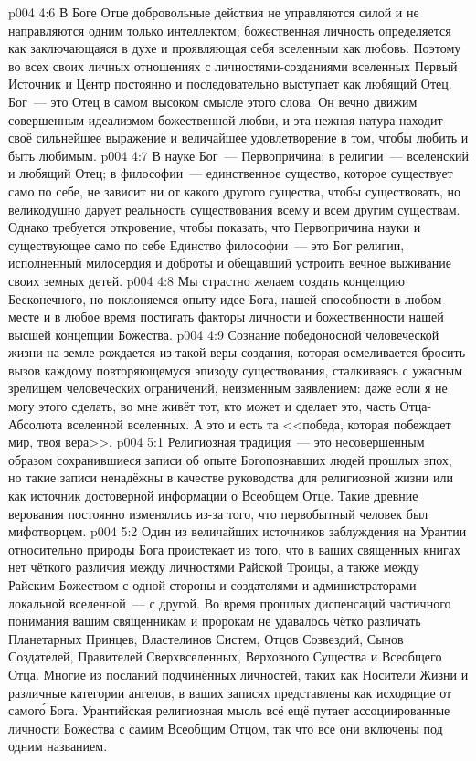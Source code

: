 \vs p004 4:6 В Боге Отце добровольные действия не управляются силой и не направляются одним только интеллектом; божественная личность определяется как заключающаяся в духе и проявляющая себя вселенным как любовь. Поэтому во всех своих личных отношениях с личностями\hyp{}созданиями вселенных Первый Источник и Центр постоянно и последовательно выступает как любящий Отец. Бог~--- это Отец в самом высоком смысле этого слова. Он вечно движим совершенным идеализмом божественной любви, и эта нежная натура находит своё сильнейшее выражение и величайшее удовлетворение в том, чтобы любить и быть любимым.
\vs p004 4:7 \pc В науке Бог~--- Первопричина; в религии~--- вселенский и любящий Отец; в философии~--- единственное существо, которое существует само по себе, не зависит ни от какого другого существа, чтобы существовать, но великодушно дарует реальность существования всему и всем другим существам. Однако требуется откровение, чтобы показать, что Первопричина науки и существующее само по себе Единство философии~--- это Бог религии, исполненный милосердия и доброты и обещавший устроить вечное выживание своих земных детей.
\vs p004 4:8 Мы страстно желаем создать концепцию Бесконечного, но поклоняемся опыту\hyp{}идее Бога, нашей способности в любом месте и в любое время постигать факторы личности и божественности нашей высшей концепции Божества.
\vs p004 4:9 Сознание победоносной человеческой жизни на земле рождается из такой веры создания, которая осмеливается бросить вызов каждому повторяющемуся эпизоду существования, сталкиваясь с ужасным зрелищем человеческих ограничений, неизменным заявлением: даже если я не могу этого сделать, во мне живёт тот, кто может и сделает это, часть Отца\hyp{}Абсолюта вселенной вселенных. А это и есть та <<победа, которая побеждает мир, твоя вера>>.
\vs p004 5:1 Религиозная традиция~--- это несовершенным образом сохранившиеся записи об опыте Богопознавших людей прошлых эпох, но такие записи ненадёжны в качестве руководства для религиозной жизни или как источник достоверной информации о Всеобщем Отце. Такие древние верования постоянно изменялись из\hyp{}за того, что первобытный человек был мифотворцем.
\vs p004 5:2 Один из величайших источников заблуждения на Урантии относительно природы Бога проистекает из того, что в ваших священных книгах нет чёткого различия между личностями Райской Троицы, а также между Райским Божеством с одной стороны и создателями и администраторами локальной вселенной~--- с другой. Во время прошлых диспенсаций частичного понимания вашим священникам и пророкам не удавалось чётко различать Планетарных Принцев, Властелинов Систем, Отцов Созвездий, Сынов Создателей, Правителей Сверхвселенных, Верховного Существа и Всеобщего Отца. Многие из посланий подчинённых личностей, таких как Носители Жизни и различные категории ангелов, в ваших записях представлены как исходящие от самог\'о Бога. Урантийская религиозная мысль всё ещё путает ассоциированные личности Божества с самим Всеобщим Отцом, так что все они включены под одним названием.
